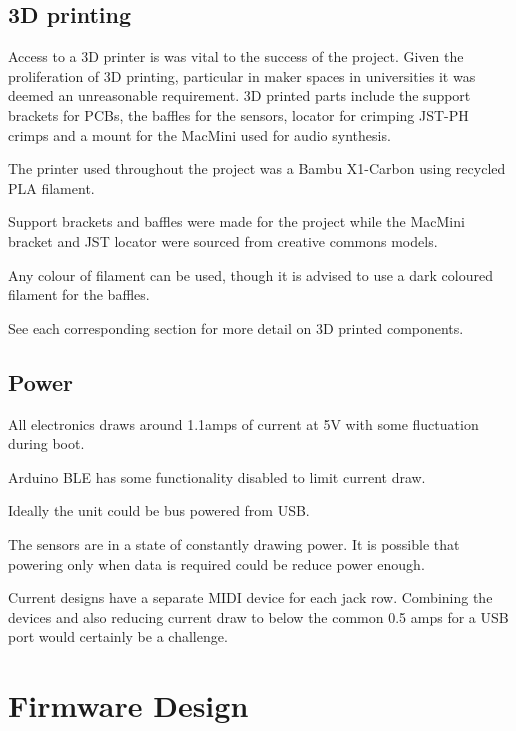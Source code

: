 

\subsection{3D printing}\label{d-printing}

Access to a 3D printer is was vital to the success of the project. Given
the proliferation of 3D printing, particular in maker spaces in
universities it was deemed an unreasonable requirement. 3D printed parts
include the support brackets for PCBs, the baffles for the sensors,
locator for crimping JST-PH crimps and a mount for the MacMini used for
audio synthesis.

The printer used throughout the project was a Bambu X1-Carbon using
recycled PLA filament.

Support brackets and baffles were made for the project while the MacMini
bracket and JST locator were sourced from creative commons models.

Any colour of filament can be used, though it is advised to use a dark
coloured filament for the baffles.

See each corresponding section for more detail on 3D printed components.

\subsection{Power}\label{power}

All electronics draws around 1.1amps of current at 5V with some
fluctuation during boot.

Arduino BLE has some functionality disabled to limit current draw.

Ideally the unit could be bus powered from USB.

The sensors are in a state of constantly drawing power. It is possible
that powering only when data is required could be reduce power enough.

Current designs have a separate MIDI device for each jack row. Combining
the devices and also reducing current draw to below the common 0.5 amps
for a USB port would certainly be a challenge.

\section{Firmware Design}\label{firmware-design}

